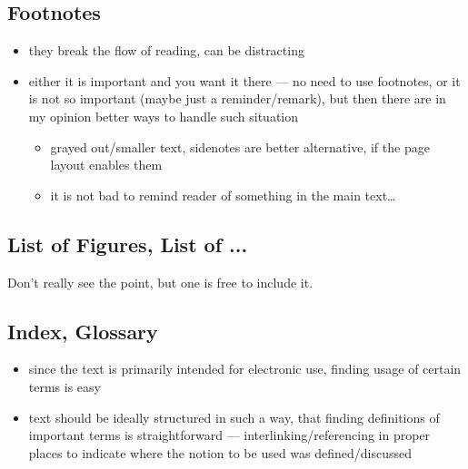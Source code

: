 \subsection{Footnotes}%
\label{sub:Footnotes}

\begin{itemize}
    \item they break the flow of reading, can be distracting
    \item either it is important and you want it there --- no need to use footnotes,
          or it is not so important (maybe just a reminder/remark), but then there
          are in my opinion better ways to handle such situation
          \begin{itemize}
              \item grayed out/smaller text, sidenotes are better alternative, if the page layout enables them
              \item it is not bad to remind reader of something in the main text\ldots
          \end{itemize}
\end{itemize}

\subsection{List of Figures, List of ...}%
\label{sub:List of Figures List of ...}

Don't really see the point, but one is free to include it.

\subsection{Index, Glossary}%
\label{sub:Index Glossary}

\begin{itemize}
    \item since the text is primarily intended for electronic use, finding usage of certain terms is easy
    \item text should be ideally structured in such a way, that finding definitions of important terms is straightforward --- interlinking/referencing in proper places to indicate where the notion to be used was defined/discussed
\end{itemize}
